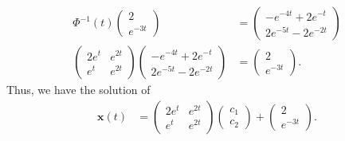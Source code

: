 \documentclass[10pt]{mypackage}
\begin{document}
\begin{solution}[8.3, Problem 16]
\begin{align*}
    \Phi^{-1}\left( t \right) \begin{pmatrix}2\\e^{-3t}\end{pmatrix} &= \begin{pmatrix}-e^{-4t} + 2e^{-t} \\ 2e^{-5t} - 2e^{-2t}\end{pmatrix}\\
    \begin{pmatrix}2e^{t} & e^{2t} \\ e^{t} & e^{2t}\end{pmatrix}\begin{pmatrix}-e^{-4t} + 2e^{-t} \\ 2e^{-5t} - 2e^{-2t}\end{pmatrix} &= \begin{pmatrix}2\\e^{-3t}\end{pmatrix}.
  \end{align*}
  Thus, we have the solution of
  \begin{align*}
    \mathbf{x}(t) &= \begin{pmatrix}2e^{t} & e^{2t} \\ e^{t} & e^{2t}\end{pmatrix} \begin{pmatrix}c_1\\c_2\end{pmatrix} + \begin{pmatrix}2\\e^{-3t}\end{pmatrix}.
  \end{align*}
\end{solution}
\end{document}
